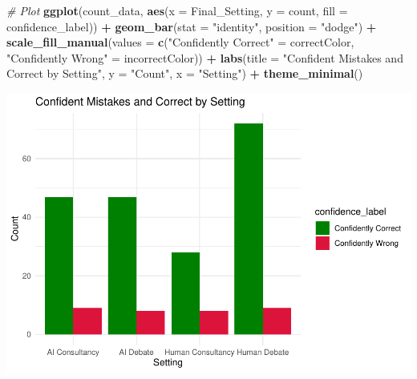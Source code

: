 \documentclass[
]{article}
\newenvironment{Shaded}{\begin{snugshade}}{\end{snugshade}}
\newcommand{\AttributeTok}[1]{\textcolor[rgb]{0.13,0.29,0.53}{#1}}
\newcommand{\CommentTok}[1]{\textcolor[rgb]{0.56,0.35,0.01}{\textit{#1}}}
\newcommand{\FunctionTok}[1]{\textcolor[rgb]{0.13,0.29,0.53}{\textbf{#1}}}
\newcommand{\NormalTok}[1]{#1}
\newcommand{\OtherTok}[1]{\textcolor[rgb]{0.56,0.35,0.01}{#1}}
\newcommand{\SpecialCharTok}[1]{\textcolor[rgb]{0.81,0.36,0.00}{\textbf{#1}}}
\newcommand{\StringTok}[1]{\textcolor[rgb]{0.31,0.60,0.02}{#1}}
\begin{document}
\begin{Shaded}
\begin{Highlighting}[]
\CommentTok{\# Plot}
\FunctionTok{ggplot}\NormalTok{(count\_data, }\FunctionTok{aes}\NormalTok{(}\AttributeTok{x =} \StringTok{\textasciigrave{}}\AttributeTok{Final\_Setting}\StringTok{\textasciigrave{}}\NormalTok{, }\AttributeTok{y =}\NormalTok{ count, }\AttributeTok{fill =}\NormalTok{ confidence\_label)) }\SpecialCharTok{+}
  \FunctionTok{geom\_bar}\NormalTok{(}\AttributeTok{stat =} \StringTok{"identity"}\NormalTok{, }\AttributeTok{position =} \StringTok{"dodge"}\NormalTok{) }\SpecialCharTok{+}
  \FunctionTok{scale\_fill\_manual}\NormalTok{(}\AttributeTok{values =} \FunctionTok{c}\NormalTok{(}\StringTok{"Confidently Correct"} \OtherTok{=}\NormalTok{ correctColor, }\StringTok{"Confidently Wrong"} \OtherTok{=}\NormalTok{ incorrectColor)) }\SpecialCharTok{+}
  \FunctionTok{labs}\NormalTok{(}\AttributeTok{title =} \StringTok{"Confident Mistakes and Correct by Setting"}\NormalTok{, }\AttributeTok{y =} \StringTok{"Count"}\NormalTok{, }\AttributeTok{x =} \StringTok{"Setting"}\NormalTok{) }\SpecialCharTok{+}
  \FunctionTok{theme\_minimal}\NormalTok{()}
\end{Highlighting}
\end{Shaded}

\includegraphics{debate-2309_files/figure-latex/confident mistakes-1.pdf}
\end{document}
